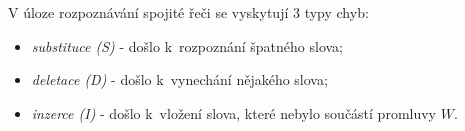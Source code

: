 




V úloze rozpoznávání spojité řeči se vyskytují 3 typy chyb:

\begin{itemize}
  \item \textit{substituce (S)} - došlo  k~rozpoznání špatného slova;
  \item \textit{deletace (D)} - došlo  k~vynechání nějakého slova;
  \item \textit{inzerce (I)} - došlo  k~vložení slova, které nebylo součástí promluvy $W$.
\end{itemize}

